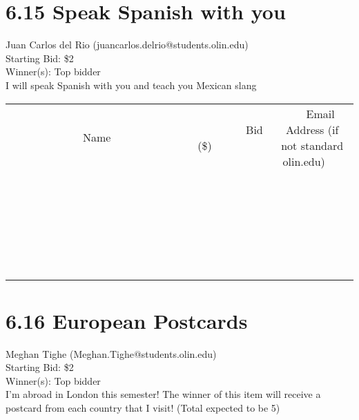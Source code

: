 \documentclass[11pt]{article}
\begin{document}
\section*{6.15 Speak Spanish with you}
Juan Carlos del Rio (juancarlos.delrio@students.olin.edu) \\
Starting Bid: \$2 \\
Winner(s): 
Top bidder \\
I will speak Spanish with you and teach you Mexican slang \\[6ex]
\begin{tabular}{c c c}
~~~~~~~~~~~~~Name~~~~~~~~~~~~~ & ~~~~~~~~~Bid (\$)~~~~~~~~~ & ~~~Email Address (if not standard olin.edu)~~~ \\
 & & \\
\hline
 & & \\
\hline
 & & \\
\hline
 & & \\
\hline
 & & \\
\hline
 & & \\
\hline
 & & \\
\hline
 & & \\
\hline
 & & \\
\hline
 & & \\
\hline
 & & \\
\hline
 & & \\
\hline
 & & \\
\hline
 & & \\
\hline
 & & \\
\hline
 & & \\
\hline
 & & \\
\hline
 & & \\
\hline
 & & \\
\hline
 & & \\
\hline
 & & \\
\hline
 & & \\
\hline
 & & \\
\hline
 & & \\
\hline
 & & \\
\hline
 & & \\
\hline
\end{tabular}
\clearpage
\section*{6.16 European Postcards}
Meghan Tighe (Meghan.Tighe@students.olin.edu) \\
Starting Bid: \$2 \\
Winner(s): 
Top bidder \\
I'm abroad in London this semester! The winner of this item will receive a postcard from each country that I visit! (Total expected to be 5)
\end{document}
